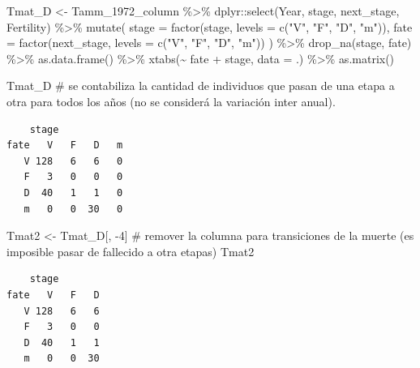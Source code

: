 \documentclass[
  12pt,
  letterpaper,
]{book}
\newenvironment{Shaded}{\begin{snugshade}}{\end{snugshade}}
\newcommand{\AttributeTok}[1]{\textcolor[rgb]{0.40,0.45,0.13}{#1}}
\newcommand{\CommentTok}[1]{\textcolor[rgb]{0.37,0.37,0.37}{#1}}
\newcommand{\DecValTok}[1]{\textcolor[rgb]{0.68,0.00,0.00}{#1}}
\newcommand{\FunctionTok}[1]{\textcolor[rgb]{0.28,0.35,0.67}{#1}}
\newcommand{\NormalTok}[1]{\textcolor[rgb]{0.00,0.23,0.31}{#1}}
\newcommand{\OtherTok}[1]{\textcolor[rgb]{0.00,0.23,0.31}{#1}}
\newcommand{\SpecialCharTok}[1]{\textcolor[rgb]{0.37,0.37,0.37}{#1}}
\newcommand{\StringTok}[1]{\textcolor[rgb]{0.13,0.47,0.30}{#1}}
\begin{document}
\begin{Shaded}
\begin{Highlighting}[]
\NormalTok{Tmat\_D }\OtherTok{\textless{}{-}}\NormalTok{ Tamm\_1972\_column }\SpecialCharTok{\%\textgreater{}\%}
\NormalTok{  dplyr}\SpecialCharTok{::}\FunctionTok{select}\NormalTok{(Year, stage, next\_stage, Fertility) }\SpecialCharTok{\%\textgreater{}\%}
  \FunctionTok{mutate}\NormalTok{(}
    \AttributeTok{stage =} \FunctionTok{factor}\NormalTok{(stage, }\AttributeTok{levels =} \FunctionTok{c}\NormalTok{(}\StringTok{"V"}\NormalTok{, }\StringTok{"F"}\NormalTok{, }\StringTok{"D"}\NormalTok{, }\StringTok{"m"}\NormalTok{)),}
    \AttributeTok{fate =} \FunctionTok{factor}\NormalTok{(next\_stage, }\AttributeTok{levels =} \FunctionTok{c}\NormalTok{(}\StringTok{"V"}\NormalTok{, }\StringTok{"F"}\NormalTok{, }\StringTok{"D"}\NormalTok{, }\StringTok{"m"}\NormalTok{))}
\NormalTok{  ) }\SpecialCharTok{\%\textgreater{}\%}
  \FunctionTok{drop\_na}\NormalTok{(stage, fate) }\SpecialCharTok{\%\textgreater{}\%}
  \FunctionTok{as.data.frame}\NormalTok{() }\SpecialCharTok{\%\textgreater{}\%}
  \FunctionTok{xtabs}\NormalTok{(}\SpecialCharTok{\textasciitilde{}}\NormalTok{ fate }\SpecialCharTok{+}\NormalTok{ stage, }\AttributeTok{data =}\NormalTok{ .) }\SpecialCharTok{\%\textgreater{}\%}
  \FunctionTok{as.matrix}\NormalTok{()}

\NormalTok{Tmat\_D }\CommentTok{\# se contabiliza la cantidad de individuos que pasan de una etapa a otra para todos los años (no se considerá la variación inter anual).}
\end{Highlighting}
\end{Shaded}

\begin{verbatim}
    stage
fate   V   F   D   m
   V 128   6   6   0
   F   3   0   0   0
   D  40   1   1   0
   m   0   0  30   0
\end{verbatim}

\begin{Shaded}
\begin{Highlighting}[]
\NormalTok{Tmat2 }\OtherTok{\textless{}{-}}\NormalTok{ Tmat\_D[, }\SpecialCharTok{{-}}\DecValTok{4}\NormalTok{] }\CommentTok{\# remover la columna para transiciones de la muerte (es imposible pasar de fallecido a otra etapas)}
\NormalTok{Tmat2}
\end{Highlighting}
\end{Shaded}

\begin{verbatim}
    stage
fate   V   F   D
   V 128   6   6
   F   3   0   0
   D  40   1   1
   m   0   0  30
\end{verbatim}
\end{document}
